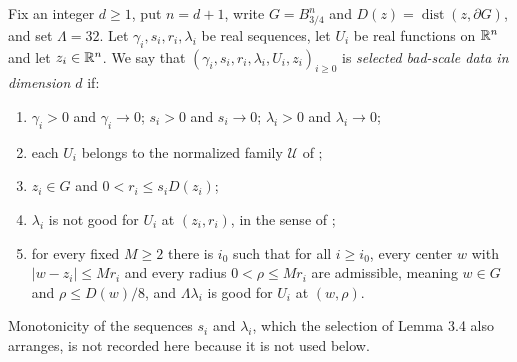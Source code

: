 \begin{definition}
Fix an integer $d\ge1$, put $n=d+1$, write $G=B_{3/4}^n$ and
$D(z)=\operatorname{dist}(z,\partial G)$, and set $\Lambda=32$. Let
$\gamma_i,s_i,r_i,\lambda_i$ be real sequences, let $U_i$ be real functions on
$\mathbb{R}^n$ and let $z_i\in\mathbb{R}^n$. We say that
$(\gamma_i,s_i,r_i,\lambda_i,U_i,z_i)_{i\ge0}$ is \emph{selected bad-scale data
in dimension $d$} if:
\begin{enumerate}
\item $\gamma_i>0$ and $\gamma_i\to0$; $s_i>0$ and $s_i\to0$; $\lambda_i>0$ and
$\lambda_i\to0$;
\item each $U_i$ belongs to the normalized family $\mathcal U$ of
;
\item $z_i\in G$ and $0<r_i\le s_iD(z_i)$;
\item $\lambda_i$ is not good for $U_i$ at $(z_i,r_i)$, in the sense of
;
\item for every fixed $M\ge2$ there is $i_0$ such that for all $i\ge i_0$, every
center $w$ with $|w-z_i|\le Mr_i$ and every radius $0<\rho\le Mr_i$ are
admissible, meaning $w\in G$ and $\rho\le D(w)/8$, and $\Lambda\lambda_i$ is good
for $U_i$ at $(w,\rho)$.
\end{enumerate}
Monotonicity of the sequences $s_i$ and $\lambda_i$, which the selection of
Lemma 3.4 also arranges, is not recorded here because it is not used below.
\end{definition}
